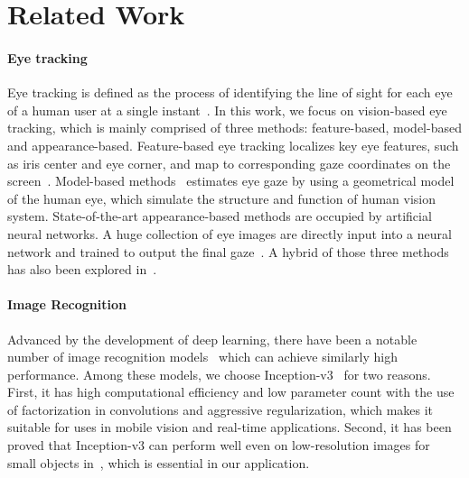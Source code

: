 \section{Related Work}

\paragraph{Eye tracking}

Eye tracking is defined as the process of identifying the line of sight for each
eye of a human user at a single instant~\cite{kim2019nvgaze}. In this work, we
focus on vision-based eye tracking, which is mainly comprised of three methods:
feature-based, model-based and appearance-based. Feature-based eye tracking
localizes key eye features, such as iris center and eye corner, and map to
corresponding gaze coordinates on the screen~\cite{sesma2012evaluation,
torricelli2008neural}. Model-based methods~\cite{wood20163d, wang2017real}
estimates eye gaze by using a geometrical model of the human eye, which simulate
the structure and function of human vision system. State-of-the-art
appearance-based methods are occupied by artificial neural networks. A huge
collection of eye images are directly input into a neural network and trained to
output the final gaze~\cite{zhang2015appearance, schneider2014manifold,
sugano2014learning}. A hybrid of those three methods has also been explored
in~\cite{kim2019nvgaze, wang2018hierarchical}.

\paragraph{Image Recognition}

Advanced by the development of deep learning, there have been a notable number
of image recognition models~\cite{simonyan2014very, szegedy2015going,
szegedy2016rethinking, he2016deep, szegedy2017inception} which can achieve
similarly high performance. Among these models, we choose
Inception-v3~\cite{szegedy2016rethinking} for two reasons. First, it has high
computational efficiency and low parameter count with the use of factorization
in convolutions and aggressive regularization, which makes it suitable for uses
in mobile vision and real-time applications. Second, it has been proved that
Inception-v3 can perform well even on low-resolution images for small objects
in~\cite{szegedy2016rethinking}, which is essential in our application.

